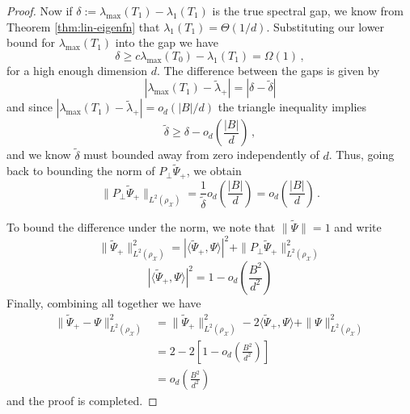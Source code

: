 \begin{proof}
    Now if $\delta := \lambda_{\max}(T_1) - \lambda_1(T_1)$ is the true spectral gap, we know from Theorem \ref{thm:lin-eigenfn} that $\lambda_1(T_1) = \Theta(1/d)$. Substituting our lower bound for $\lambda_{\max}(T_1)$ into the gap we have
    \[
        \delta \geq c\lambda_{\max}(T_0) - \lambda_1(T_1) = \Omega(1)\, ,
    \]
    for a high enough dimension $d$. The difference between the gaps is given by
    \[
        |\lambda_{\max}(T_1) - \tilde{\lambda}_{+}| = |\delta - \tilde{\delta}|
    \]
    and since $|\lambda_{\max}(T_1) - \tilde{\lambda}_{+}| = o_d(|B|/d)$ the triangle inequality implies
    \[
        \tilde{\delta} \geq \delta - o_d\left(\frac{|B|}{d}\right) \, ,
    \]
    and we know $\tilde{\delta}$ must bounded away from zero independently of $d$. Thus, going back to bounding the norm of $P_\perp \tilde{\Psi}_{+}$, we obtain
    \[
         \|P_{\perp}\tilde{\Psi}_{+} \|_{L^2(\rho_{\mathcal X})}   = \frac{1}{\tilde{\delta}} o_d\left(\frac{|B|}{d}\right) = o_d\left(\frac{|B|}{d}\right)\, .
    \]
    
    To bound the difference under the norm, we note that $\|\tilde{\Psi}\| = 1$ and write
    \[
        \| \tilde{\Psi}_{+} \|_{L^2(\rho_{\mathcal X})} ^2 = |\langle \tilde{\Psi}_{+}, \Psi\rangle|^2 + \|P_{\perp} \tilde{\Psi}_{+}\|_{L^2(\rho_{\mathcal X})} ^2
    \]
    \[
        |\langle \tilde{\Psi}_{+}, \Psi\rangle|^2 = 1 - o_d\left(\frac{B^2}{d^2}\right)
    \]
    Finally, combining all together we have
    \begin{align*}
        \| \tilde{\Psi}_{+} - \Psi\|_{L^2(\rho_{\mathcal X})} ^2 &= \| \tilde{\Psi}_{+} \|_{L^2(\rho_{\mathcal X})} ^2 -2\langle \tilde{\Psi}_{+}, \Psi\rangle + \|\Psi\|_{L^2(\rho_{\mathcal X})} ^2\\
        &= 2 - 2\left[1- o_d\left(\frac{B^2}{d^2}\right)\right]\\
        &=  o_d\left(\frac{B^2}{d^2}\right)
    \end{align*}
    and the proof is completed.
\end{proof}

